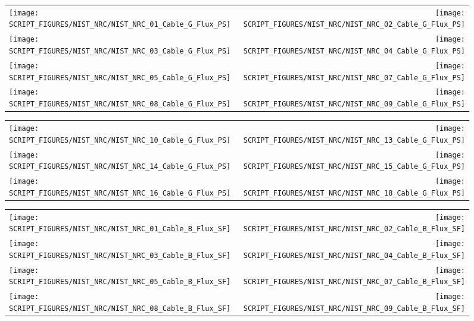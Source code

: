 \clearpage

\begin{figure}[p]
\begin{tabular*}{\textwidth}{l@{\extracolsep{\fill}}r}
\texttt{[image: SCRIPT\_FIGURES/NIST\_NRC/NIST\_NRC\_01\_Cable\_G\_Flux\_PS]} &
\texttt{[image: SCRIPT\_FIGURES/NIST\_NRC/NIST\_NRC\_02\_Cable\_G\_Flux\_PS]} \\
\texttt{[image: SCRIPT\_FIGURES/NIST\_NRC/NIST\_NRC\_03\_Cable\_G\_Flux\_PS]} &
\texttt{[image: SCRIPT\_FIGURES/NIST\_NRC/NIST\_NRC\_04\_Cable\_G\_Flux\_PS]} \\
\texttt{[image: SCRIPT\_FIGURES/NIST\_NRC/NIST\_NRC\_05\_Cable\_G\_Flux\_PS]} &
\texttt{[image: SCRIPT\_FIGURES/NIST\_NRC/NIST\_NRC\_07\_Cable\_G\_Flux\_PS]} \\
\texttt{[image: SCRIPT\_FIGURES/NIST\_NRC/NIST\_NRC\_08\_Cable\_G\_Flux\_PS]} &
\texttt{[image: SCRIPT\_FIGURES/NIST\_NRC/NIST\_NRC\_09\_Cable\_G\_Flux\_PS]}
\end{tabular*}
\end{figure}

\begin{figure}[p]
\begin{tabular*}{\textwidth}{l@{\extracolsep{\fill}}r}
\texttt{[image: SCRIPT\_FIGURES/NIST\_NRC/NIST\_NRC\_10\_Cable\_G\_Flux\_PS]} &
\texttt{[image: SCRIPT\_FIGURES/NIST\_NRC/NIST\_NRC\_13\_Cable\_G\_Flux\_PS]} \\
\texttt{[image: SCRIPT\_FIGURES/NIST\_NRC/NIST\_NRC\_14\_Cable\_G\_Flux\_PS]} &
\texttt{[image: SCRIPT\_FIGURES/NIST\_NRC/NIST\_NRC\_15\_Cable\_G\_Flux\_PS]} \\
\texttt{[image: SCRIPT\_FIGURES/NIST\_NRC/NIST\_NRC\_16\_Cable\_G\_Flux\_PS]} &
\texttt{[image: SCRIPT\_FIGURES/NIST\_NRC/NIST\_NRC\_18\_Cable\_G\_Flux\_PS]}
\end{tabular*}
\end{figure}

\begin{figure}[p]
\begin{tabular*}{\textwidth}{l@{\extracolsep{\fill}}r}
\texttt{[image: SCRIPT\_FIGURES/NIST\_NRC/NIST\_NRC\_01\_Cable\_B\_Flux\_SF]} &
\texttt{[image: SCRIPT\_FIGURES/NIST\_NRC/NIST\_NRC\_02\_Cable\_B\_Flux\_SF]} \\
\texttt{[image: SCRIPT\_FIGURES/NIST\_NRC/NIST\_NRC\_03\_Cable\_B\_Flux\_SF]} &
\texttt{[image: SCRIPT\_FIGURES/NIST\_NRC/NIST\_NRC\_04\_Cable\_B\_Flux\_SF]} \\
\texttt{[image: SCRIPT\_FIGURES/NIST\_NRC/NIST\_NRC\_05\_Cable\_B\_Flux\_SF]} &
\texttt{[image: SCRIPT\_FIGURES/NIST\_NRC/NIST\_NRC\_07\_Cable\_B\_Flux\_SF]} \\
\texttt{[image: SCRIPT\_FIGURES/NIST\_NRC/NIST\_NRC\_08\_Cable\_B\_Flux\_SF]} &
\texttt{[image: SCRIPT\_FIGURES/NIST\_NRC/NIST\_NRC\_09\_Cable\_B\_Flux\_SF]}
\end{tabular*}
\end{figure}

